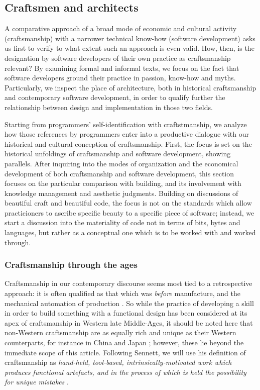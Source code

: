 \subsection{Craftsmen and architects}
\label{subsec:craftsmen-architect}

A comparative approach of a broad mode of economic and cultural activity (craftsmanship) with a narrower technical know-how (software development) asks us first to verify to what extent such an approach is even valid. How, then, is the designation by software developers of their own practice as craftsmanship relevant?  By examining formal and informal texts, we focus on the fact that software developers ground their practice in passion, know-how and myths. Particularly, we inspect the place of architecture, both in historical craftsmanship and contemporary software development, in order to qualify further the relationship between design and implementation in those two fields.

Starting from programmers' self-identification with craftstmanship, we analyze how those references by programmers enter into a productive dialogue with our historical and cultural conception of craftsmanship. First, the focus is set on the historical unfoldings of craftsmanship and software development, showing parallels. After inquiring into the modes of organization and the economical development of both craftsmanship and software development, this section focuses on the particular comparison with building, and its involvement with knowledge management and aesthetic judgments.  Building on discussions of beautiful craft and beautiful code, the focus is not on the standards which allow practicioners to ascribe specific beauty to a specific piece of software; instead, we start a discussion into the materiality of code not in terms of bits, bytes and languages, but rather as a conceptual one which is to be worked with and worked through.

\subsubsection{Craftsmanship through the ages}
\label{subsubsec:history-craftsmanship}

Craftsmanship in our contemporary discourse seems most tied to a retrospective approach: it is often qualified as that which was \emph{before} manufacture, and the mechanical automation of production \citep{thompson_study_1934}. So while the practice of developing a skill in order to build something with a functional design has been considered at its apex of craftsmanship in Western late Middle-Ages, it should be noted here that non-Western craftsmanship are as equally rich and unique as their Western counterparts, for instance in China \citep{zhang_jingdezhen_2015} and Japan \citep{jordan_copying_2003}; however, these lie beyond the immediate scope of this article. Following Sennett, we will use his definition of craftsmanship as \emph{hand-held, tool-based, intrinsically-motivated work which produces functional artefacts, and in the process of which is held the possibility for unique mistakes} \citep{sennett_craftsman_2009}.

